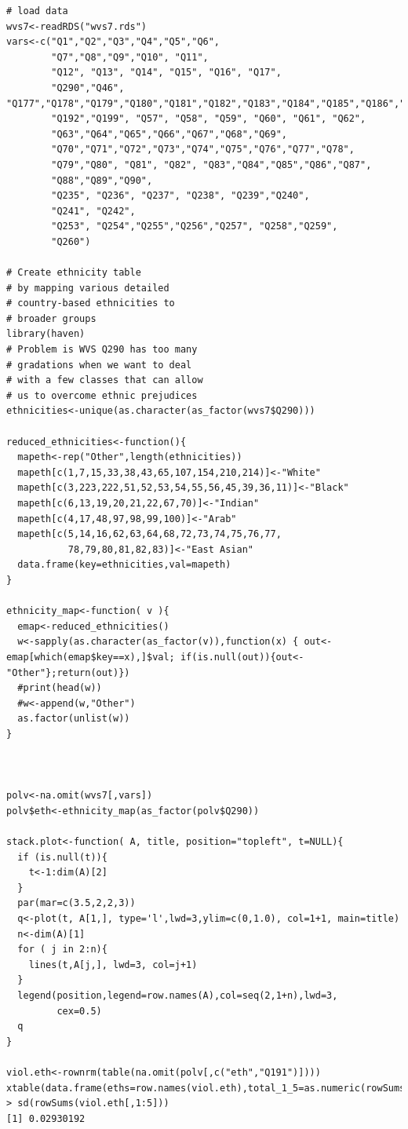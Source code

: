 \documentclass{amsart}
\begin{document}
\begin{verbatim}
# load data
wvs7<-readRDS("wvs7.rds")
vars<-c("Q1","Q2","Q3","Q4","Q5","Q6",
        "Q7","Q8","Q9","Q10", "Q11",
        "Q12", "Q13", "Q14", "Q15", "Q16", "Q17",
        "Q290","Q46", "Q177","Q178","Q179","Q180","Q181","Q182","Q183","Q184","Q185","Q186","Q187","Q188","Q189","Q190","Q191","Q192","Q193","Q194","Q195","Q275",
        "Q192","Q199", "Q57", "Q58", "Q59", "Q60", "Q61", "Q62",
        "Q63","Q64","Q65","Q66","Q67","Q68","Q69",
        "Q70","Q71","Q72","Q73","Q74","Q75","Q76","Q77","Q78",
        "Q79","Q80", "Q81", "Q82", "Q83","Q84","Q85","Q86","Q87",
        "Q88","Q89","Q90", 
        "Q235", "Q236", "Q237", "Q238", "Q239","Q240",
        "Q241", "Q242",
        "Q253", "Q254","Q255","Q256","Q257", "Q258","Q259", 
        "Q260")

# Create ethnicity table 
# by mapping various detailed
# country-based ethnicities to
# broader groups
library(haven)
# Problem is WVS Q290 has too many 
# gradations when we want to deal 
# with a few classes that can allow 
# us to overcome ethnic prejudices
ethnicities<-unique(as.character(as_factor(wvs7$Q290)))

reduced_ethnicities<-function(){
  mapeth<-rep("Other",length(ethnicities))
  mapeth[c(1,7,15,33,38,43,65,107,154,210,214)]<-"White"
  mapeth[c(3,223,222,51,52,53,54,55,56,45,39,36,11)]<-"Black"
  mapeth[c(6,13,19,20,21,22,67,70)]<-"Indian"
  mapeth[c(4,17,48,97,98,99,100)]<-"Arab"
  mapeth[c(5,14,16,62,63,64,68,72,73,74,75,76,77,
           78,79,80,81,82,83)]<-"East Asian"
  data.frame(key=ethnicities,val=mapeth)
}

ethnicity_map<-function( v ){
  emap<-reduced_ethnicities()
  w<-sapply(as.character(as_factor(v)),function(x) { out<-emap[which(emap$key==x),]$val; if(is.null(out)){out<-"Other"};return(out)})
  #print(head(w))
  #w<-append(w,"Other")
  as.factor(unlist(w))
}



polv<-na.omit(wvs7[,vars])
polv$eth<-ethnicity_map(as_factor(polv$Q290))

stack.plot<-function( A, title, position="topleft", t=NULL){
  if (is.null(t)){
    t<-1:dim(A)[2]
  }
  par(mar=c(3.5,2,2,3))
  q<-plot(t, A[1,], type='l',lwd=3,ylim=c(0,1.0), col=1+1, main=title)
  n<-dim(A)[1]
  for ( j in 2:n){
    lines(t,A[j,], lwd=3, col=j+1)
  }
  legend(position,legend=row.names(A),col=seq(2,1+n),lwd=3,
         cex=0.5)
  q
}

viol.eth<-rownrm(table(na.omit(polv[,c("eth","Q191")])))
xtable(data.frame(eths=row.names(viol.eth),total_1_5=as.numeric(rowSums(viol.eth[,1:5])))
> sd(rowSums(viol.eth[,1:5]))
[1] 0.02930192
\end{verbatim}
\end{document}
